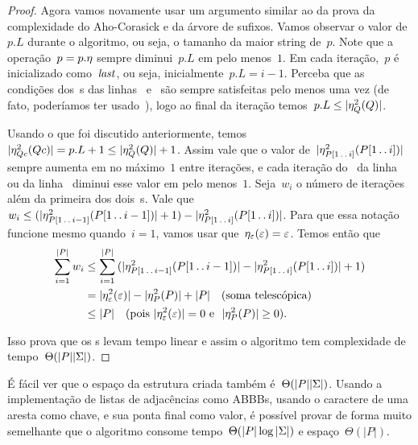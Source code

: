 \begin{proof}
Agora vamos novamente usar um argumento similar ao da prova da complexidade do Aho-Corasick e da árvore de sufixos. Vamos observar o valor de~$p.L$ durante o algoritmo, ou seja, o tamanho da maior string de~$p$. Note que a operação~${p = p.\eta}$ sempre diminui~$p.L$ em pelo menos~$1$. Em cada iteração,~$p$ é inicializado como~$\mathit{last}$, ou seja, inicialmente~${p.L = i - 1}$. Perceba que as condições dos~s das linhas~ e~ são sempre satisfeitas pelo menos uma vez (de fato, poderíamos ter usado~), logo ao final da iteração temos~${p.L \leq |\eta^2_{Q}(Q)|}$.

Usando o que foi discutido anteriormente, temos~${|\eta^2_{Qc}(Qc)| = p.L + 1 \leq |\eta^2_{Q}(Q)| + 1}$. Assim vale que o valor de~$|\eta^2_{P[1\,.\,.\, i]}(P[1\,.\,.\, i])|$ sempre aumenta em no máximo~$1$ entre iterações, e cada iteração do~ da linha~ ou da linha~ diminui esse valor em pelo menos~$1$. Seja~$w_i$ o número de iterações além da primeira dos dois~s. Vale que~${w_i \leq (|\eta^2_{P[1\,.\,.\, i-1]}(P[1\,.\,.\, i-1])| + 1) - |\eta^2_{P[1\,.\,.\, i]}(P[1\,.\,.\, i])|}$. Para que essa notação funcione mesmo quando~${i = 1}$, vamos usar que~${\eta_\varepsilon(\varepsilon) = \varepsilon}$. Temos então que
\begin{equation*} \begin{split}
\sum\limits_{i=1}^{|P|}{w_i} & \leq \sum\limits_{i=1}^{|P|}{(|\eta^2_{P[1\,.\,.\, i-1]}(P[1\,.\,.\, i-1])| - |\eta^2_{P[1\,.\,.\, i]}(P[1\,.\,.\, i])| + 1)} \\
                         & = |\eta^2_\varepsilon(\varepsilon)| - |\eta^2_P(P)| + |P| \quad\text{(soma telescópica)}\\
                         & \leq |P| \quad\text{(pois~$|\eta^2_\varepsilon(\varepsilon)| = 0$ e ~$|\eta^2_P(P)| \geq 0$).}
\end{split}
\end{equation*}

Isso prova que os s levam tempo linear e assim o algoritmo tem complexidade de tempo~$\Theta(|P||\Sigma|)$.

\end{proof}

É fácil ver que o espaço da estrutura criada também é~$\Theta(|P||\Sigma|)$. Usando a implementação de listas de adjacências como ABBBs, usando o caractere de uma aresta como chave, e sua ponta final como valor, é possível provar de forma muito semelhante que o algoritmo consome tempo~$\Theta(|P|\log|\Sigma|)$ e espaço~$\Theta(|P|)$.

